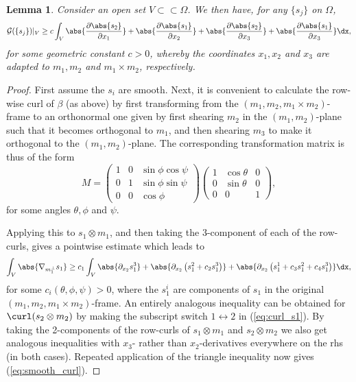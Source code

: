 \documentclass[11pt,reqno]{amsart}
\theoremstyle{plain}
\newtheorem{lemma}[theorem]{Lemma}
\theoremstyle{definition}
\theoremstyle{remark}
\begin{document}
\begin{lemma} \label{lemma:curl}
Consider an open set $V \subset\subset \Omega$. We then have, for any $\{s_j\}$ on $\Omega$,
\begin{equation}\label{eq:smooth_curl}
\mathcal{G}(\{s_j\})|_V \ge c  \int_V \abs{\frac{\partial \abs{s_2}}{\partial x_1}}  +  \abs{\frac{\partial \abs{s_1}}{\partial x_2}} + \abs{\frac{\partial \abs{s_2}}{\partial x_3}}  +  \abs{\frac{\partial \abs{s_1}}{\partial x_3}}\dx,
\end{equation}
for some geometric constant $c>0$, whereby the coordinates $x_1,x_2$ and $x_3$ are adapted to $m_1, m_2$ and $m_1\times m_2$, respectively. 
\end{lemma}
\begin{proof}
First assume the $s_i$ are smooth. Next, it is convenient to calculate the row-wise curl of $\beta$ (as above) by first transforming from the $(m_1,m_2,m_1\times m_2)$-frame to an orthonormal one given by first shearing $m_2$ in the $(m_1,m_2)$-plane such that it becomes orthogonal to $m_1$, and then shearing $m_3$ to make it orthogonal to the $(m_1,m_2)$-plane. The corresponding transformation matrix is thus of the form
\begin{equation}
M = \left( 
\begin{array}{ccc}
1 & 0 & \sin\phi\cos\psi\\
0 & 1 & \sin\phi\sin\psi\\
0 & 0 & \cos\phi
\end{array}
\right)
\left(
\begin{array}{ccc}
1 & \cos\theta & 0\\
0 & \sin\theta & 0\\
0 & 0 & 1
\end{array}
\right),
\end{equation}
for some angles $\theta, \phi$ and $\psi$.

Applying this to $s_1\otimes m_1$, and then taking the 3-component of each of the row-curls, gives a pointwise estimate which leads to
\begin{equation}\label{eq:curl_s1}
\int_V \abs{\nabla_{m_1^{\perp}} s_1}\geq c_1\int_V \abs{\partial_{x_2}s_1^3} + \abs{\partial_{x_2}\left(s_1^2 + c_2s_1^3\right)} + \abs{\partial_{x_2}\left(s_1^1 + c_3s_1^2 + c_4s_1^3\right)}\dx,
\end{equation}
for some $c_i(\theta,\phi,\psi)>0$, where the $s_1^i$ are components of $s_1$ in the original $(m_1, m_2,m_1\times m_2)$-frame.
An entirely analogous inequality can be obtained for $\curl(s_2\otimes m_2)$ by making the subscript switch $1\leftrightarrow2$ in (\ref{eq:curl_s1}). By taking the 2-components of the row-curls of $s_1\otimes m_1$ and $s_2\otimes m_2$ we also get analogous inequalities with $x_3$- rather than $x_2$-derivatives everywhere on the rhs (in both cases). Repeated application of the triangle inequality now gives (\ref{eq:smooth_curl}).


\end{proof}
\end{document}
